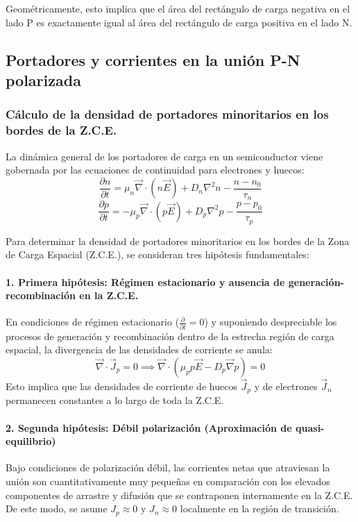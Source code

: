Geométricamente, esto implica que el área del rectángulo de carga negativa en el lado P es exactamente igual al área del rectángulo de carga positiva en el lado N.

\newpage
\subsection*{Portadores y corrientes en la unión P-N polarizada}

\subsubsection*{Cálculo de la densidad de portadores minoritarios en los bordes de la Z.C.E.}

La dinámica general de los portadores de carga en un semiconductor viene gobernada por las ecuaciones de continuidad para electrones y huecos:
\[
\frac{\partial n}{\partial t} = \mu_n \vec{\nabla} \cdot (n\vec{E}) + D_n \nabla^2 n - \frac{n - n_0}{\tau_n}
\]
\[
\frac{\partial p}{\partial t} = -\mu_p \vec{\nabla} \cdot (p\vec{E}) + D_p \nabla^2 p - \frac{p - p_0}{\tau_p}
\]

Para determinar la densidad de portadores minoritarios en los bordes de la Zona de Carga Espacial (Z.C.E.), se consideran tres hipótesis fundamentales:

\paragraph{1. Primera hipótesis: Régimen estacionario y ausencia de generación-recombinación en la Z.C.E.}
En condiciones de régimen estacionario ($\frac{\partial}{\partial t} = 0$) y suponiendo despreciable los procesos de generación y recombinación dentro de la estrecha región de carga espacial, la divergencia de las densidades de corriente se anula:
\[
\vec{\nabla} \cdot \vec{J}_p = 0 \implies \vec{\nabla} \cdot \left( \mu_p p \vec{E} - D_p \vec{\nabla} p \right) = 0
\]
Esto implica que las densidades de corriente de huecos $\vec{J}_p$ y de electrones $\vec{J}_n$ permanecen constantes a lo largo de toda la Z.C.E.

\paragraph{2. Segunda hipótesis: Débil polarización (Aproximación de quasi-equilibrio)}
Bajo condiciones de polarización débil, las corrientes netas que atraviesan la unión son cuantitativamente muy pequeñas en comparación con los elevados componentes de arrastre y difusión que se contraponen internamente en la Z.C.E. De este modo, se asume $J_p \approx 0$ y $J_n \approx 0$ localmente en la región de transición.

